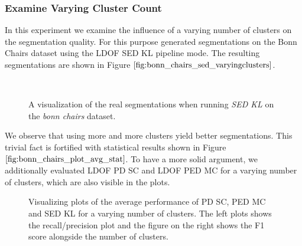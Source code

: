 \subsubsection{Examine Varying Cluster Count}
In this experiment we examine the influence of a varying number of clusters on the segmentation quality. For this purpose generated segmentations on the Bonn Chairs dataset using the LDOF SED KL pipeline mode. The resulting segmentations are shown in Figure $\ref{fig:bonn_chairs_sed_varyingclusters}$.
\begin{figure}[H]
\begin{center}
~
~
\end{center}
\caption[Bonn Chairs SED Segmentations for Varying Cluster Count]{A visualization of the real segmentations when running \textit{SED KL} on the \textit{bonn chairs} dataset.}
\label{fig:bonn_chairs_sed_varyingclusters}
\end{figure}
We observe that using more and more clusters yield better segmentations. This trivial fact is fortified with statistical results shown in Figure $\ref{fig:bonn_chairs_plot_avg_stat}$. To have a more solid argument, we additionally evaluated LDOF PD SC and LDOF PED MC for a varying number of clusters, which are also visible in the plots.
\begin{figure}[H]
\begin{center}
\end{center}
\caption[Bonn Chairs Varying Clusters]{Visualizing plots of the average performance of PD SC, PED MC and SED KL for a varying number of clusters. The left plots shows the recall/precision plot and the figure on the right shows the F1 score alongside the number of clusters.}
\label{fig:bonn_chairs_plot_avg_stat}
\end{figure}

